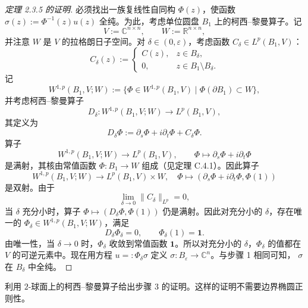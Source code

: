 \begin{proof}[定理 2.3.5 的证明]
必须找出一族复线性自同构 $\Phi(z)$，使函数
$\sigma(z):=\Phi^{-1}(z)u(z)$ 全纯。为此，考虑单位圆盘 $B_1$ 上的柯西--黎曼算子。记
\[
  V:=\mathbb C^{n\times n},
  \qquad W:=\mathbb R^{n\times n},
\]
并注意 $W$ 是 $V$ 的拉格朗日子空间。对 $\delta\in(0,\varepsilon)$，考虑函数
$C_\delta\in L^p(B_1,V)$：
\[
  C_\delta(z):=
  \begin{cases}
    C(z),&z\in B_\delta,\\
    0,&z\in B_1\setminus B_\delta.
  \end{cases}
\]
记
\[
  W^{1,p}(B_1,V;W):=
  \{\Phi\in W^{1,p}(B_1,V)\mid\Phi(\partial B_1)\subset W\},
\]
并考虑柯西--黎曼算子
\[
  D_\delta:W^{1,p}(B_1,V;W)\longrightarrow L^p(B_1,V),
\]
其定义为
\[
  D_\delta\Phi:=\partial_s\Phi+i\partial_t\Phi+C_\delta\Phi.
\]
算子
\[
  W^{1,p}(B_1,V;W)\longrightarrow L^p(B_1,V),
  \qquad \Phi\longmapsto\partial_s\Phi+i\partial_t\Phi
\]
是满射，其核由常值函数 $\Phi:B_1\to W$ 组成（见定理 C.4.1）。因此算子
\[
  W^{1,p}(B_1,V;W)\longrightarrow L^p(B_1,V)\times W,
  \quad
  \Phi\longmapsto(\partial_s\Phi+i\partial_t\Phi,\Phi(1))
\]
是双射。由于
\[
  \lim_{\delta\to0}\|C_\delta\|_{L^p}=0,
\]
当 $\delta$ 充分小时，算子 $\Phi\mapsto(D_\delta\Phi,\Phi(1))$ 仍是满射。因此对充分小的
$\delta$，存在唯一的 $\Phi_\delta\in W^{1,p}(B_1,V;W)$，满足
\[
  D_\delta\Phi_\delta=0,
  \qquad \Phi_\delta(1)=\mathbf1.
\]
由唯一性，当 $\delta\to0$ 时，$\Phi_\delta$ 收敛到常值函数 $\mathbf1$。所以对充分小的
$\delta$，$\Phi_\delta$ 的值都在 $V$ 的可逆元素中。现在用方程
$u=: \Phi_\delta\sigma$ 定义 $\sigma:B_\varepsilon\to\mathbb C^n$。与步骤 1 相同可知，
$\sigma$ 在 $B_\delta$ 中全纯。
\end{proof}

\begin{exercise}\label{ex:2-3-6}
利用 $2$-球面上的柯西--黎曼算子给出步骤 3 的证明。这样的证明不需要边界椭圆正则性。
\end{exercise}
